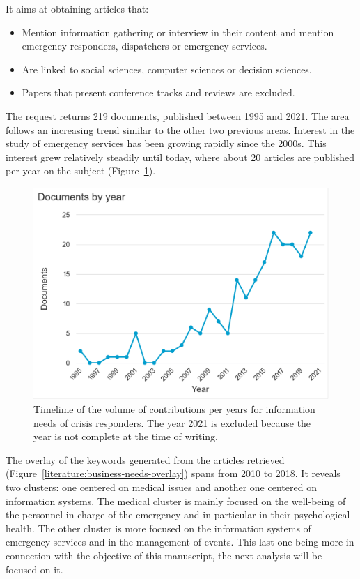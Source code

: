 It aims at obtaining articles that:

\begin{itemize}
    \item Mention information gathering or interview in their content and mention emergency responders, dispatchers or emergency services.
    \item Are linked to social sciences, computer sciences or decision sciences.
    \item Papers that present conference tracks and reviews are excluded.
\end{itemize}

The request returns 219 documents, published between 1995 and 2021.
The area follows an increasing trend similar to the other two previous areas.
Interest in the study of emergency services has been growing rapidly since the 2000s.
This interest grew relatively steadily until today, where about 20 articles are published per year on the subject (Figure~\ref{literature:business-needs-hist}).

\begin{figure}[htb]
    \centering
    \includegraphics[width=\textwidth]{figures/chap-2/business-needs-hist.pdf}
    \caption{Timelime of the volume of contributions per years for information needs of crisis responders. The year 2021 is excluded because the year is not complete at the time of writing.}
    \label{literature:business-needs-hist}
\end{figure}

The overlay of the keywords generated from the articles retrieved (Figure~\ref{literature:business-needs-overlay}) spans from 2010 to 2018.
It reveals two clusters: one centered on medical issues and another one centered on information systems.
The medical cluster is mainly focused on the well-being of the personnel in charge of the emergency and in particular in their psychological health.
The other cluster is more focused on the information systems of emergency services and in the management of events.
This last one being more in connection with the objective of this manuscript, the next analysis will be focused on it.

